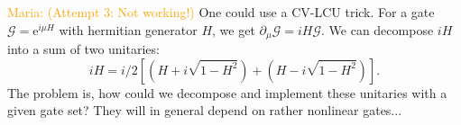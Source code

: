 \documentclass[aps,pra,10pt,twocolumn,groupedaddress,nofootinbib]{revtex4-1}
\theoremstyle{plain}
\newcommand{\ket}[1]{\ensuremath{\left| #1 \right \rangle}}
\newcommand{\x}{\hat{x}}
\newcommand{\p}{\hat{p}}
\renewcommand{\c}{\hat{c}}
\renewcommand{\d}{\hat{d}}
\newcommand{\e}{\mathrm{e}}
\newcommand{\G}{\mathcal{G}}
\newcommand{\maria}[1]{\textcolor{orange}{Maria: #1}}
\begin{document}
\maria{(Attempt 3: Not working!)}
One could use a CV-LCU trick. For a gate $ \G = \e^{i\mu H}$ with hermitian generator $H$, we get $\partial_{\mu} \G = i H \G$. We can decompose $iH$ into a sum of two unitaries:
\[iH = i/2 \left[ \left( H +i \sqrt{1 - H^2}\right) +  \left( H -i \sqrt{1 - H^2} \right)\right] . \]
The problem is, how could we decompose and implement these unitaries with a given gate set? They will in general depend on rather nonlinear gates... 

%
%
%
%
\end{document}
